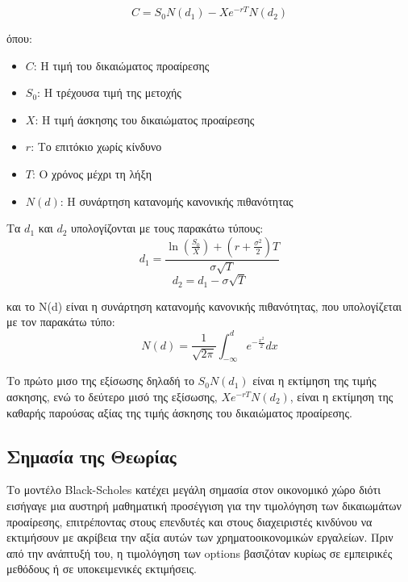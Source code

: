 \begin{equation}
    C = S_0 N(d_1) - X e^{-rT} N(d_2)
\end{equation}

όπου:
\begin{itemize}
    \item $C$: Η τιμή του δικαιώματος προαίρεσης
    \item $S_0$: Η τρέχουσα τιμή της μετοχής
    \item $X$: Η τιμή άσκησης του δικαιώματος προαίρεσης
    \item $r$: Το επιτόκιο χωρίς κίνδυνο
    \item $T$: Ο χρόνος μέχρι τη λήξη
    \item $N(d)$: Η συνάρτηση κατανομής κανονικής πιθανότητας
\end{itemize}

Τα $d_1$ και $d_2$ υπολογίζονται με τους παρακάτω τύπους:
\begin{equation}
    d_1 = \frac{\ln(\frac{S_0}{X}) + (r + \frac{\sigma^2}{2})T}{\sigma \sqrt{T}}
\end{equation}
\begin{equation}
    d_2 = d_1 - \sigma \sqrt{T}
\end{equation}

και το N(d) είναι η συνάρτηση κατανομής κανονικής πιθανότητας, που υπολογίζεται με τον παρακάτω τύπο:
\begin{equation}
    N(d) = \frac{1}{\sqrt{2\pi}} \int_{-\infty}^{d} e^{-\frac{x^2}{2}} dx
\end{equation}

Το πρώτο μισο της εξίσωσης δηλαδή το $S_0 N(d_1)$ είναι η εκτίμηση της τιμής ασκησης,
ενώ το δεύτερο μισό της εξίσωσης, $X e^{-rT} N(d_2)$, είναι η εκτίμηση της καθαρής παρούσας αξίας της τιμής άσκησης του δικαιώματος προαίρεσης.

\subsection{Σημασία της Θεωρίας}
Το μοντέλο Black-Scholes κατέχει μεγάλη σημασία στον οικονομικό χώρο διότι εισήγαγε μια αυστηρή μαθηματική προσέγγιση για την τιμολόγηση των δικαιωμάτων προαίρεσης,
επιτρέποντας στους επενδυτές και στους διαχειριστές κινδύνου να εκτιμήσουν με ακρίβεια την αξία αυτών των χρηματοοικονομικών εργαλείων.
Πριν από την ανάπτυξή του, η τιμολόγηση των options βασιζόταν κυρίως σε εμπειρικές μεθόδους ή σε υποκειμενικές εκτιμήσεις.

